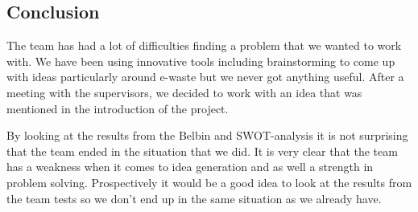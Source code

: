 \subsection{Conclusion}
The team has had a lot of difficulties finding a problem that we wanted to work with. We have been using innovative tools including brainstorming to come up with ideas particularly around e-waste but we never got anything useful. After a meeting with the supervisors, we decided to work with an idea that was mentioned in the introduction of the project.

By looking at the results from the Belbin and SWOT-analysis it is not surprising that the team ended in the situation that we did. It is very clear that the team has a weakness when it comes to idea generation and as well a strength in problem solving. Prospectively it would be a good idea to look at the results from the team tests so we don't end up in the same situation as we already have.

